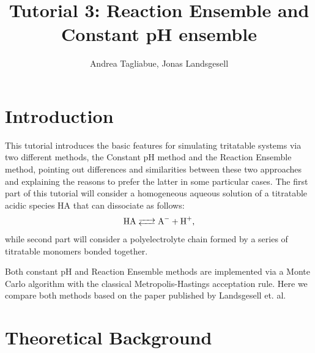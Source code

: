 \documentclass[
a4paper,                        %
11pt,                           %
twoside,                        %
footsepline,                    %
headsepline,                    %
headexclude,                    %
footexclude,                    %
pagesize,                       %
]{scrartcl}
\begin{document}
\title{Tutorial 3: Reaction Ensemble and Constant pH ensemble}
\author{Andrea Tagliabue, Jonas Landsgesell}

\maketitle
\tableofcontents

\section{Introduction}

This tutorial introduces the basic features for simulating tritatable systems via two different methods, the Constant pH method and the Reaction Ensemble method, pointing out differences and similarities between these two approaches and explaining the reasons to prefer the latter in some particular cases.
The first part of this tutorial will consider a homogeneous aqueous solution of a titratable acidic species HA that can dissociate as follows:
\begin{equation}\label{disso}
\ce{HA <--> A- + H+}\text{,}
\end{equation}
while second part will consider a polyelectrolyte chain formed by a series of titratable monomers bonded together.

\noindent Both constant pH and Reaction Ensemble methods are implemented via a Monte Carlo algorithm with the classical Metropolis-Hastings acceptation rule. Here we compare both methods based on the paper published by Landsgesell et. al\cite{landsgesell2017simulation}.

\section{Theoretical Background}
\end{document}
